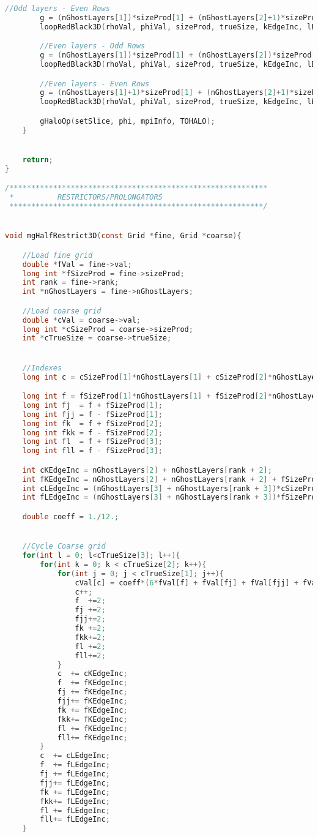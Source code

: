 \begin{lstlisting}[language=c, caption = main routine]
 		//Odd layers - Even Rows
 		g = (nGhostLayers[1])*sizeProd[1] + (nGhostLayers[2]+1)*sizeProd[2] + nGhostLayers[3]*sizeProd[3];
 		loopRedBlack3D(rhoVal, phiVal, sizeProd, trueSize, kEdgeInc, lEdgeInc,	g);

 		//Even layers - Odd Rows
 		g = (nGhostLayers[1])*sizeProd[1] + (nGhostLayers[2])*sizeProd[2] + (nGhostLayers[3]+1)*sizeProd[3];
 		loopRedBlack3D(rhoVal, phiVal, sizeProd, trueSize, kEdgeInc, lEdgeInc,	g);

		//Even layers - Even Rows
 		g = (nGhostLayers[1]+1)*sizeProd[1] + (nGhostLayers[2]+1)*sizeProd[2] + (nGhostLayers[3]+1)*sizeProd[3];
 		loopRedBlack3D(rhoVal, phiVal, sizeProd, trueSize, kEdgeInc, lEdgeInc,	g);

		gHaloOp(setSlice, phi, mpiInfo, TOHALO);
	}


	return;
}

/***********************************************************
 *			RESTRICTORS/PROLONGATORS
 **********************************************************/


void mgHalfRestrict3D(const Grid *fine, Grid *coarse){

	//Load fine grid
	double *fVal = fine->val;
	long int *fSizeProd = fine->sizeProd;
	int rank = fine->rank;
	int *nGhostLayers = fine->nGhostLayers;

	//Load coarse grid
	double *cVal = coarse->val;
	long int *cSizeProd = coarse->sizeProd;
	int *cTrueSize = coarse->trueSize;


	//Indexes
	long int c = cSizeProd[1]*nGhostLayers[1] + cSizeProd[2]*nGhostLayers[2] + cSizeProd[3]*nGhostLayers[3];

	long int f = fSizeProd[1]*nGhostLayers[1] + fSizeProd[2]*nGhostLayers[2] + fSizeProd[3]*nGhostLayers[3];
	long int fj  = f + fSizeProd[1];
	long int fjj = f - fSizeProd[1];
	long int fk  = f + fSizeProd[2];
	long int fkk = f - fSizeProd[2];
	long int fl  = f + fSizeProd[3];
	long int fll = f - fSizeProd[3];

	int cKEdgeInc = nGhostLayers[2] + nGhostLayers[rank + 2];
	int fKEdgeInc = nGhostLayers[2] + nGhostLayers[rank + 2] + fSizeProd[2];
	int cLEdgeInc = (nGhostLayers[3] + nGhostLayers[rank + 3])*cSizeProd[2];
	int fLEdgeInc = (nGhostLayers[3] + nGhostLayers[rank + 3])*fSizeProd[2] + fSizeProd[3];

	double coeff = 1./12.;


	//Cycle Coarse grid
	for(int l = 0; l<cTrueSize[3]; l++){
		for(int k = 0; k < cTrueSize[2]; k++){
			for(int j = 0; j < cTrueSize[1]; j++){
				cVal[c] = coeff*(6*fVal[f] + fVal[fj] + fVal[fjj] + fVal[fk] + fVal[fkk] + fVal[fl] + fVal[fll]);
				c++;
				f  +=2;
				fj +=2;
				fjj+=2;
				fk +=2;
				fkk+=2;
				fl +=2;
				fll+=2;
			}
			c  += cKEdgeInc;
			f  += fKEdgeInc;
			fj += fKEdgeInc;
			fjj+= fKEdgeInc;
			fk += fKEdgeInc;
			fkk+= fKEdgeInc;
			fl += fKEdgeInc;
			fll+= fKEdgeInc;
		}
		c  += cLEdgeInc;
		f  += fLEdgeInc;
		fj += fLEdgeInc;
		fjj+= fLEdgeInc;
		fk += fLEdgeInc;
		fkk+= fLEdgeInc;
		fl += fLEdgeInc;
		fll+= fLEdgeInc;
	}


\end{lstlisting}
